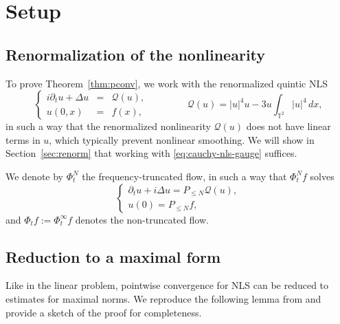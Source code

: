 \documentclass[11pt, xcolor = dvipsnames,reqno
]{amsart}
\theoremstyle{definition}
\theoremstyle{remark}
\begin{document}
    




\section{Setup}\label{sec:setup}

\subsection{Renormalization of the nonlinearity}
\label{sec:Renomalized}
To prove Theorem~\ref{thm:pconv}, 
we work with the renormalized quintic NLS
\begin{equation}\label{eq:cauchy-nls-gauge}
		\left\{
		\begin{array}{rcl}
			i\partial_t u + \Delta u & = & \mathcal{Q}(u), 
			\\
			u(0,x) & = & f(x),
		\end{array}
		\right.
        \qquad \qquad 
        \mathcal{Q}(u) = |u|^4 u - 3 u \int_{\mathbb T^2} |u|^4 \, dx,
	\end{equation}
in such a way that the renormalized nonlinearity $\mathcal{Q}(u)$ does not have linear terms in $u$, which typically prevent nonlinear smoothing.     
We will show in Section~\ref{sec:renorm} that working with \eqref{eq:cauchy-nls-gauge} suffices. 

We denote by $\Phi^N_t$ the frequency-truncated flow, 
in such a way that $\Phi^N_t f$ solves
\begin{equation}\label{eq:nlsTruncated}
	\left\{
	\begin{array}{l}		 
		\partial_t u  + i \Delta u = P_{\leq N} \mathcal{Q} ( u ),	\\
		u(0) = P_{\leq N} f,
		\end{array}
		\right.
	\end{equation}
and	$\Phi_t f  := \Phi^{\infty}_t f$ denotes the non-truncated flow.
    




\subsection{Reduction to a maximal form}\label{sec:maximalest-approach}
Like in the linear problem, 
pointwise convergence for NLS can be reduced to estimates for maximal norms.
We reproduce the following lemma from \cite{CLS2020} and provide a sketch of the proof for completeness.
\end{document}
